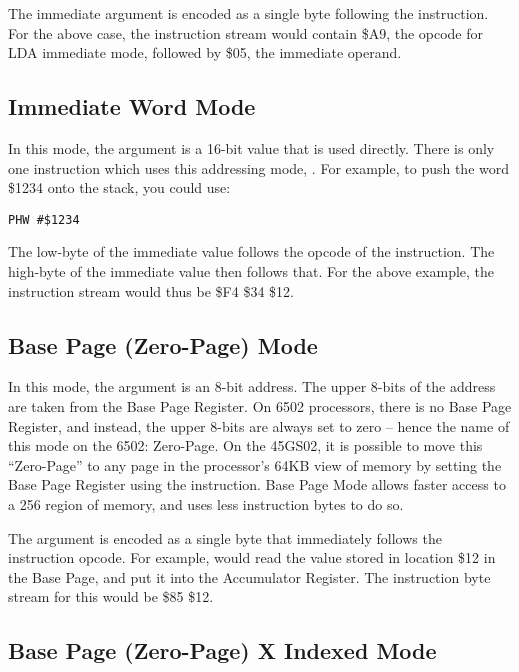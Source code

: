The immediate argument is encoded as a single byte following the instruction.  For the above
case, the instruction stream would contain \$A9, the opcode for LDA immediate mode, followed
by \$05, the immediate operand.

\subsection{Immediate Word Mode}

In this mode, the argument is a 16-bit value that is used directly. There is only one instruction
which uses this addressing mode, .  For example, to push the word \$1234
onto the stack, you could use:

\begin{tcolorbox}[colback=black,coltext=white]
\verbatimfont{\codefont}
\begin{verbatim}
PHW #$1234
\end{verbatim}
\end{tcolorbox}

The low-byte of the immediate value follows the opcode of the instruction.  The high-byte of the
immediate value then follows that.  For the above example, the instruction stream would thus
be \$F4 \$34 \$12.

\subsection{Base Page (Zero-Page) Mode}

In this mode, the argument is an 8-bit address.  The upper 8-bits of the address are taken from
the Base Page Register.  On 6502 processors, there is no Base Page Register, and instead, the
upper 8-bits are always set to zero -- hence the name of this mode on the 6502: Zero-Page. On
the 45GS02, it is possible to move this ``Zero-Page'' to any page in the processor's 64KB view
of memory by setting the Base Page Register using the  instruction. Base Page
Mode allows faster access to a 256 region of memory, and uses less instruction bytes to do so.

The argument is encoded as a single byte that immediately follows the instruction opcode. For
example,  would read the value stored in location \$12 in the Base Page,
and put it into the Accumulator Register.  The instruction byte stream for this would be
\$85 \$12.

\subsection{Base Page (Zero-Page) X Indexed Mode}

